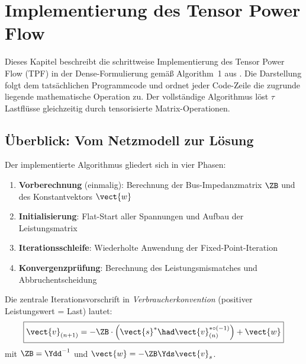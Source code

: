 \chapter{Implementierung des Tensor Power Flow}
\label{ch:implementierung_tpf}

Dieses Kapitel beschreibt die schrittweise Implementierung des Tensor Power Flow (TPF) in der Dense-Formulierung gemäß Algorithm~1 aus \cite{Salazar2024}. Die Darstellung folgt dem tatsächlichen Programmcode und ordnet jeder Code-Zeile die zugrunde liegende mathematische Operation zu. Der vollständige Algorithmus löst $\tau$ Lastflüsse gleichzeitig durch tensorisierte Matrix-Operationen.

\section{Überblick: Vom Netzmodell zur Lösung}
\label{sec:ueberblick_impl}

Der implementierte Algorithmus gliedert sich in vier Phasen:

\begin{enumerate}
	\item \textbf{Vorberechnung} (einmalig): Berechnung der Bus-Impedanzmatrix $\ZB$ und des Konstantvektors $\vect{w}$
	\item \textbf{Initialisierung}: Flat-Start aller Spannungen und Aufbau der Leistungsmatrix
	\item \textbf{Iterationsschleife}: Wiederholte Anwendung der Fixed-Point-Iteration
	\item \textbf{Konvergenzprüfung}: Berechnung des Leistungsmismatches und Abbruchentscheidung
\end{enumerate}

Die zentrale Iterationsvorschrift in \textit{Verbraucherkonvention} (positiver Leistungswert = Last) lautet:
\begin{equation}
	\boxed{
		\vect{v}_{(n+1)} = -\ZB \cdot \left(\vect{s}^* \had \vect{v}_{(n)}^{*\circ(-1)}\right) + \vect{w}
	}
	\label{eq:impl_kernformel}
\end{equation}
mit $\ZB = \Ydd^{-1}$ und $\vect{w} = -\ZB \Yds \vect{v}_s$.


